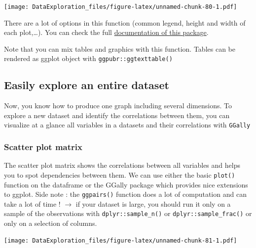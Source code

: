 \documentclass[
]{book}
\newenvironment{Shaded}{\begin{snugshade}}{\end{snugshade}}
\newcommand{\KeywordTok}[1]{\textcolor[rgb]{0.13,0.29,0.53}{\textbf{#1}}}
\newcommand{\NormalTok}[1]{#1}
\newcommand{\OperatorTok}[1]{\textcolor[rgb]{0.81,0.36,0.00}{\textbf{#1}}}
\newcommand{\StringTok}[1]{\textcolor[rgb]{0.31,0.60,0.02}{#1}}
\begin{document}
\texttt{[image: DataExploration\_files/figure-latex/unnamed-chunk-80-1.pdf]}

There are a lot of options in this function (common legend, height and width of each plot,\ldots). You can check the full \href{http://www.sthda.com/english/articles/24-ggpubr-publication-ready-plots/}{documentation of this package}.

Note that you can mix tables and graphics with this function. Tables can be rendered as ggplot object with \texttt{ggpubr::ggtexttable()}

\hypertarget{easily-explore-an-entire-dataset}{%
\subsection{Easily explore an entire dataset}\label{easily-explore-an-entire-dataset}}

Now, you know how to produce one graph including several dimensions. To explore a new dataset and identify the correlations between them, you can visualize at a glance all variables in a datasets and their correlations with \texttt{GGally}

\hypertarget{scatter-plot-matrix}{%
\subsubsection{Scatter plot matrix}\label{scatter-plot-matrix}}

The scatter plot matrix shows the correlations between all variables and helps you to spot dependencies between them. We can use either the basic \texttt{plot()} function on the dataframe or the GGally package which provides nice extensions to ggplot.
Side note : the \texttt{ggpairs()} function does a lot of computation and can take a lot of time ! \(\rightarrow\) if your dataset is large, you should run it only on a sample of the observations with \texttt{dplyr::sample\_n()} or \texttt{dplyr::sample\_frac()} or only on a selection of columns.

\begin{Shaded}
\end{Shaded}

\texttt{[image: DataExploration\_files/figure-latex/unnamed-chunk-81-1.pdf]}
\end{document}
